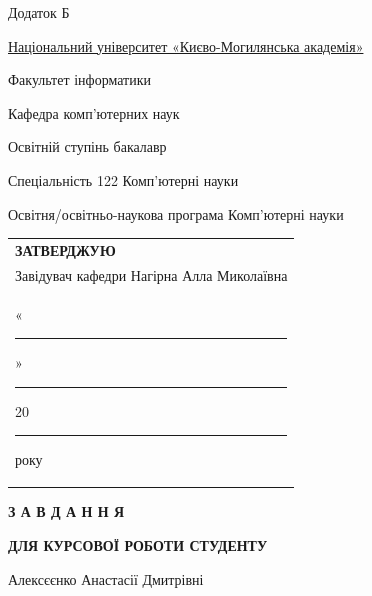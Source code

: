\documentclass[12pt]{article}
\begin{document}
\fontsize{12}{14}\selectfont

\begin{flushright}
Додаток Б
\end{flushright}

\begin{center}
\underline{Національний університет «Києво-Могилянська академія»}
\end{center}

\vspace{0.5cm}

\noindent Факультет {інформатики\hspace{10.3cm}}
\vspace{0.3cm}

\noindent Кафедра {комп'ютерних наук\hspace{9.3cm}}
\vspace{0.3cm}

\noindent Освітній ступінь {бакалавр\hspace{9.6cm}}
\vspace{0.3cm}

\noindent Спеціальність {122 Комп'ютерні науки\hspace{7.5cm}}
\vspace{0.3cm}

\noindent Освітня/освітньо-наукова програма {Комп'ютерні науки\hspace{8.6cm}}
\vspace{0.3cm}

\begin{flushright}
\begin{tabular}{l}
\textbf{ЗАТВЕРДЖУЮ} \\[0.3cm]
Завідувач кафедри Нагірна Алла Миколаївна \\[0.5cm]
«\rule{0.8cm}{0.4pt}» \rule{3cm}{0.4pt} 20\rule{0.8cm}{0.4pt} року
\end{tabular}
\end{flushright}

\vspace{0.5cm}

\begin{center}
\textbf{З А В Д А Н Н Я}

\textbf{ДЛЯ КУРСОВОЇ РОБОТИ СТУДЕНТУ}

\vspace{0.3cm}

{Алексєєнко Анастасії Дмитрівні\hspace{2.5cm}}
\end{center}

\vspace{0.3cm}
\end{document}
